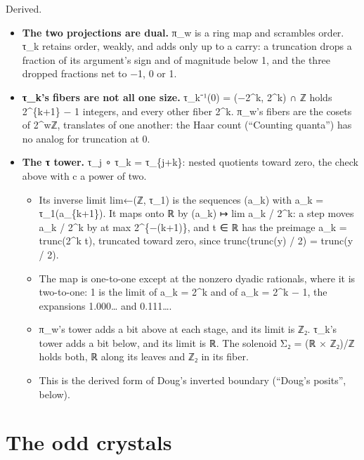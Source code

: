 Derived.

\begin{itemize}
\item \textbf{The two projections are dual.} π\_\allowbreak{}w is a ring map and scrambles order. τ\_\allowbreak{}k retains order, weakly, and adds only up to a carry: a truncation drops a fraction of its argument's sign and of magnitude below 1, and the three dropped fractions net to −1, 0 or 1.
\item \textbf{τ\_\allowbreak{}k's fibers are not all one size.} τ\_\allowbreak{}k⁻¹(0) = (−2\textasciicircum{}k, 2\textasciicircum{}k) ∩ ℤ holds 2\textasciicircum{}\{k+1\} − 1 integers, and every other fiber 2\textasciicircum{}k. π\_\allowbreak{}w's fibers are the cosets of 2\textasciicircum{}wℤ, translates of one another: the Haar count (“Counting quanta”) has no analog for truncation at 0.
\item \textbf{The τ tower.} τ\_\allowbreak{}j ∘ τ\_\allowbreak{}k = τ\_\allowbreak{}\{j+k\}: nested quotients toward zero, the check above with c a power of two.

\begin{itemize}
\item Its inverse limit lim←(ℤ, τ\_\allowbreak{}1) is the sequences (a\_\allowbreak{}k) with a\_\allowbreak{}k = τ\_\allowbreak{}1(a\_\allowbreak{}\{k+1\}). It maps onto ℝ by (a\_\allowbreak{}k) ↦ lim a\_\allowbreak{}k / 2\textasciicircum{}k: a step moves a\_\allowbreak{}k / 2\textasciicircum{}k by at max 2\textasciicircum{}\{−(k+1)\}, and t ∈ ℝ has the preimage a\_\allowbreak{}k = trunc(2\textasciicircum{}k t), truncated toward zero, since trunc(trunc(y) / 2) = trunc(y / 2).
\item The map is one-to-one except at the nonzero dyadic rationals, where it is two-to-one: 1 is the limit of a\_\allowbreak{}k = 2\textasciicircum{}k and of a\_\allowbreak{}k = 2\textasciicircum{}k − 1, the expansions 1.000… and 0.111….
\item π\_\allowbreak{}w's tower adds a bit above at each stage, and its limit is ℤ₂. τ\_\allowbreak{}k's tower adds a bit below, and its limit is ℝ. The solenoid Σ₂ = (ℝ × ℤ₂)/ℤ holds both, ℝ along its leaves and ℤ₂ in its fiber.
\item This is the derived form of Doug's inverted boundary (“Doug's posits”, below).
\end{itemize}
\end{itemize}

\section{\texorpdfstring{The odd crystals}{The odd crystals}}

